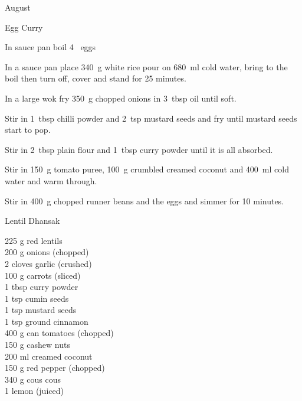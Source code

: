 \begin{menu}{August}
\begin{recipe}{2}{Egg Curry}
    \begin{instructions}
    \item 
        In sauce pan boil
        4~  eggs\item 
    In a
    sauce pan
    place
    340~g  white rice
    pour on
    680~ml  cold water,
    bring to the boil then turn off, cover and stand for 25 minutes.
  \item 
        In a large wok fry
        350~g chopped onions
        in
        3~tbsp  oil
        until soft.
      \item 
        Stir in 1~tbsp  chilli powder
        and
        2~tsp  mustard seeds
        and fry until mustard seeds start to pop.
      \item 
        Stir in
        2~tbsp  plain flour
        and
        1~tbsp  curry powder
        until it is all absorbed.
      \item 
        Stir in
        150~g  tomato puree,
        100~g crumbled creamed coconut
        and
        400~ml  cold water
        and warm through.
      \item 
        Stir in
        400~g chopped runner beans
        and the eggs
        and simmer for 10 minutes.
      
    \end{instructions}
    \end{recipe}%
  
    \begin{recipe}{2}{Lentil Dhansak}%
		\begin{ingredients}
		225 g red lentils  \\
	200 g onions (chopped) \\
	2 cloves garlic (crushed) \\
	100 g carrots (sliced) \\
	1 tbsp curry powder  \\
	1 tsp cumin seeds  \\
	1 tsp mustard seeds  \\
	1 tsp ground cinnamon  \\
	400 g can tomatoes (chopped) \\
	150 g cashew nuts  \\
	200 ml creamed coconut  \\
	150 g red pepper (chopped) \\
	340 g cous cous  \\
	1  lemon (juiced) \\
	
		\end{ingredients}
	

\end{recipe}
\end{menu}
